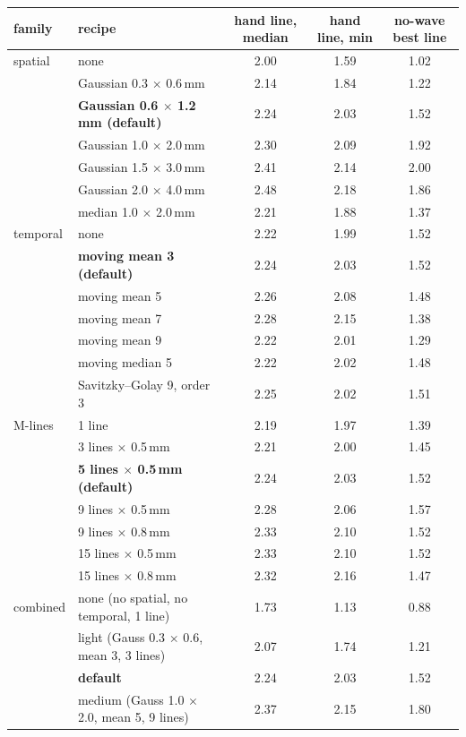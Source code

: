 \documentclass[10pt]{article}
\begin{document}
\begin{center}
\small
\begin{tabular}{llccc}
\toprule
family & recipe & hand line, median & hand line, min & no-wave best line \\
\midrule
spatial & none & 2.00 & 1.59 & 1.02 \\
 & Gaussian 0.3 $\times$ 0.6\,mm & 2.14 & 1.84 & 1.22 \\
 & \textbf{Gaussian 0.6 $\times$ 1.2\,mm (default)} & 2.24 & 2.03 & 1.52 \\
 & Gaussian 1.0 $\times$ 2.0\,mm & 2.30 & 2.09 & 1.92 \\
 & Gaussian 1.5 $\times$ 3.0\,mm & 2.41 & 2.14 & 2.00 \\
 & Gaussian 2.0 $\times$ 4.0\,mm & 2.48 & 2.18 & 1.86 \\
 & median 1.0 $\times$ 2.0\,mm & 2.21 & 1.88 & 1.37 \\
\midrule
temporal & none & 2.22 & 1.99 & 1.52 \\
 & \textbf{moving mean 3 (default)} & 2.24 & 2.03 & 1.52 \\
 & moving mean 5 & 2.26 & 2.08 & 1.48 \\
 & moving mean 7 & 2.28 & 2.15 & 1.38 \\
 & moving mean 9 & 2.22 & 2.01 & 1.29 \\
 & moving median 5 & 2.22 & 2.02 & 1.48 \\
 & Savitzky--Golay 9, order 3 & 2.25 & 2.02 & 1.51 \\
\midrule
M-lines & 1 line & 2.19 & 1.97 & 1.39 \\
 & 3 lines $\times$ 0.5\,mm & 2.21 & 2.00 & 1.45 \\
 & \textbf{5 lines $\times$ 0.5\,mm (default)} & 2.24 & 2.03 & 1.52 \\
 & 9 lines $\times$ 0.5\,mm & 2.28 & 2.06 & 1.57 \\
 & 9 lines $\times$ 0.8\,mm & 2.33 & 2.10 & 1.52 \\
 & 15 lines $\times$ 0.5\,mm & 2.33 & 2.10 & 1.52 \\
 & 15 lines $\times$ 0.8\,mm & 2.32 & 2.16 & 1.47 \\
\midrule
combined & none (no spatial, no temporal, 1 line) & 1.73 & 1.13 & 0.88 \\
 & light (Gauss 0.3 $\times$ 0.6, mean 3, 3 lines) & 2.07 & 1.74 & 1.21 \\
 & \textbf{default} & 2.24 & 2.03 & 1.52 \\
 & medium (Gauss 1.0 $\times$ 2.0, mean 5, 9 lines) & 2.37 & 2.15 & 1.80 \\

\end{tabular}
\end{center}
\end{document}
